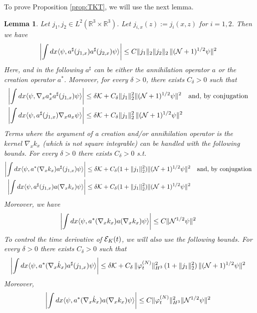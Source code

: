 \documentclass[11pt,a4paper,DIV11]{scrartcl}	%
\newtheorem{lemma}[thm]{Lemma}
\newcommand{\bR}{{\mathbb R}}
\newcommand{\cE}{{\cal E}}
\newcommand{\cK}{{\cal K}}
\newcommand{\cN}{{\cal N}}
\begin{document}
To prove Proposition \ref{prop:TKT}, we will use the next lemma. 
\begin{lemma}\label{lm:K}
Let $j_1, j_2 \in L^2 (\bR^3 \times \bR^3)$. Let $j_{i,x} (z) := j_i (x,z)$ for $i =1,2$. Then we have
\begin{equation}\label{eq:lmK-1}
\left| \int dx \langle \psi , a^\sharp (j_{1,x}) a^\sharp (j_{2,x}) \psi \rangle \right| \leq C \| j_1 \|_2 \| j_2 \|_2  \, \| (\cN+1)^{1/2} \psi \|^2 
\end{equation}
Here, and in the following $a^\sharp$ can be either the annihilation operator $a$ or the creation operator $a^*$. Moreover, for every $\delta > 0$, there exists $C_\delta > 0$ such that 
\begin{equation}\label{eq:lmK-2}
\begin{split}
\left| \int dx \langle \psi , \nabla_x a_x^* a^\sharp (j_{1,x}) \psi \rangle \right| &\leq\delta \cK +  C_\delta \| j_1 \|^2_2  \| (\cN+1)^{1/2} \psi \|^2  \quad \text{and, by conjugation} \\
\left| \int dx \langle \psi , a^\sharp (j_{1,x}) \nabla_x a_x  \psi \rangle \right| &\leq \delta \cK +  C_\delta \| j_1 \|_2^2 \, \| (\cN+1)^{1/2} \psi \|^2 \end{split} \end{equation}
Terms where the argument of a creation and/or annihilation operator is the kernel $\nabla_x k_x$ (which is not square integrable) can be handled with the following bounds. For every $\delta > 0$ there exists $C_\delta >0$ s.t. 
\begin{equation}\label{eq:lmK-3}
\begin{split}
\left| \int dx \langle \psi , a^* (\nabla_x k_x) a^\sharp (j_{1,x}) \psi \rangle \right| & \leq \delta \cK + C_\delta  (1+\| j_1 \|^2_2) \| (\cN+1)^{1/2} \psi \|^2 \quad \text{and, by conjugation} \\
\left| \int dx \langle \psi , a^\sharp (j_{1,x}) a (\nabla_x k_x)  \psi \rangle \right| & \leq \delta \cK + C_\delta (1+\| j_1 \|^2_2) \| (\cN+1)^{1/2} \psi \|^2
\end{split}
\end{equation}
Moreover, we have
\begin{equation}\label{eq:lmK-4}
\left| \int dx \langle \psi , a^* (\nabla_x k_x) a (\nabla_x k_x) \psi \rangle \right| \leq C \| \cN^{1/2} \psi \|^2
\end{equation}
To control the time derivative of $\cE_K (t)$, we will also use the following bounds. For every $\delta > 0$ there exists $C_\delta > 0$ such that 
\begin{equation}\label{eq:lmK-5} \left| \int dx \langle \psi , a^* (\nabla_x \dot{k}_x) a^\sharp (j_{1,x}) \psi \rangle \right| \leq \delta \cK + C_\delta \, \| \varphi_t^{(N)} \|_{H^3}^2 \,   (1+\| j_1 \|^2_2) \, \| (\cN+1)^{1/2} \psi \|^2 
\end{equation}
Moreover,
\begin{equation}\label{eq:lmK-6} 
\left| \int dx \langle \psi , a^* (\nabla_x \dot{k}_x) a (\nabla_x k_x) \psi \rangle \right| \leq C \| \varphi_t^{(N)} \|_{H^3}^2  \| \cN^{1/2} \psi \|^2 \end{equation}
\end{lemma}
\end{document}
